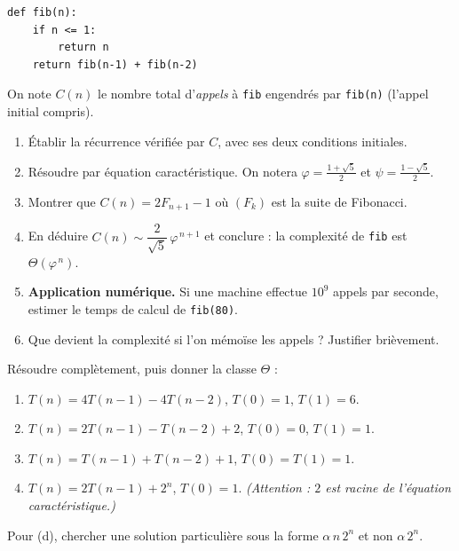 \documentclass[11pt,a4paper]{article}
\begin{document}
\begin{lstlisting}
def fib(n):
    if n <= 1:
        return n
    return fib(n-1) + fib(n-2)
\end{lstlisting}

On note $C(n)$ le nombre total d'\emph{appels} à \texttt{fib} engendrés par
\texttt{fib(n)} (l'appel initial compris).

\begin{enumerate}[label=\arabic*.,leftmargin=*]
  \item Établir la récurrence vérifiée par $C$, avec ses deux conditions initiales.
  \item Résoudre par équation caractéristique. On notera
        $\varphi=\frac{1+\sqrt5}{2}$ et $\psi=\frac{1-\sqrt5}{2}$.
  \item Montrer que $C(n) = 2F_{n+1}-1$ où $(F_k)$ est la suite de Fibonacci.
  \item En déduire $C(n)\sim \dfrac{2}{\sqrt5}\,\varphi^{\,n+1}$ et conclure :
        la complexité de \texttt{fib} est $\Theta(\varphi^{\,n})$.
  \item \textbf{Application numérique.} Si une machine effectue $10^{9}$ appels par
        seconde, estimer le temps de calcul de \texttt{fib(80)}.
  \item Que devient la complexité si l'on mémoïse les appels ? Justifier brièvement.
\end{enumerate}

Résoudre complètement, puis donner la classe $\Theta$ :

\begin{enumerate}[label=(\alph*),leftmargin=*]
  \item $T(n) = 4T(n-1) - 4T(n-2)$, \quad $T(0)=1$, $T(1)=6$.
  \item $T(n) = 2T(n-1) - T(n-2) + 2$, \quad $T(0)=0$, $T(1)=1$.
  \item $T(n) = T(n-1) + T(n-2) + 1$, \quad $T(0)=T(1)=1$.
  \item $T(n) = 2T(n-1) + 2^{n}$, \quad $T(0)=1$.
        \emph{(Attention : $2$ est racine de l'équation caractéristique.)}
\end{enumerate}

\begin{indication}
Pour (d), chercher une solution particulière sous la forme $\alpha\,n\,2^n$ et non
$\alpha\,2^n$.
\end{indication}
\end{document}
